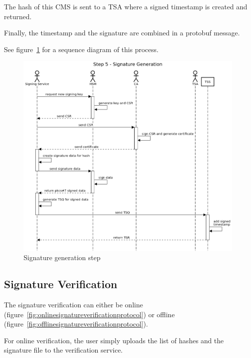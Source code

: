 The hash of this \gls{CMS} is sent to a \gls{TSA} where a signed timestamp is created and returned.

Finally, the timestamp and the signature are combined in a protobuf message.

See figure~\ref{fig:signaturegenerationstep} for a sequence diagram of this process.

\begin{figure}
    \begin{center}
        \includegraphics[scale=0.45]{images/protocol_step5_signature_generation.png}
        \caption{Signature generation step}
        \label{fig:signaturegenerationstep}
    \end{center}
\end{figure}

\subsection{Signature Verification}\label{subsec:signature-verification}

The signature verification can either be online (figure~\ref{fig:onlinesignatureverificationprotocol})
or offline (figure~\ref{fig:offlinesignatureverificationprotocol}).

For online verification, the user simply uploads the list of hashes and the signature file to the verification service.

